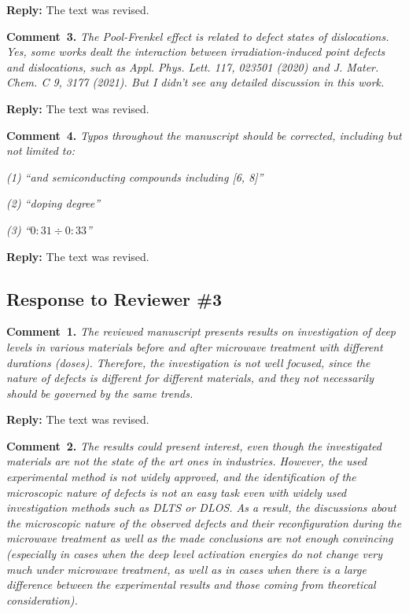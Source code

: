 \documentclass[10pt]{iopart}
\begin{document}
\noindent
\textcolor[rgb]{0.51,0.00,0.00}{\textbf{Reply:}}
The text was revised.


\vspace{1cm}
\noindent
\textcolor[rgb]{0.00,0.50,1.00}{\textbf{Comment~3.}}
\emph{The Pool-Frenkel effect is related to defect states of dislocations.
Yes, some works dealt the interaction between irradiation-induced point defects and dislocations,
such as Appl. Phys. Lett. 117, 023501 (2020) and J. Mater. Chem. C 9, 3177 (2021).
But I didn’t see any detailed discussion in this work.}

\noindent
\textcolor[rgb]{0.51,0.00,0.00}{\textbf{Reply:}}
The text was revised.

\cite{LightNeuIrrad:1,LightNeuIrrad:2,SiC:bookCh17}


\vspace{1cm}
\noindent
\textcolor[rgb]{0.00,0.50,1.00}{\textbf{Comment~4.}}
\emph{Typos throughout the manuscript should be corrected, including but not limited to:}

\emph{(1) ``and semiconducting compounds including [6, 8]''}

\emph{(2) ``doping degree''}

\emph{(3) ``$0:31\div0:33$''}

\noindent
\textcolor[rgb]{0.51,0.00,0.00}{\textbf{Reply:}}
The text was revised.


\subsection*{Response to Reviewer \#3 }
\noindent
\textcolor[rgb]{0.00,0.50,1.00}{\textbf{Comment~1.}}
\emph{The reviewed manuscript presents results on investigation of deep levels
in various materials before and after microwave treatment with different durations (doses).
Therefore, the investigation is not well focused, since the nature of defects is different
for different materials, and they not necessarily should be governed by the same trends. }

\noindent
\textcolor[rgb]{0.51,0.00,0.00}{\textbf{Reply:}}
The text was revised.


\vspace{1cm}
\noindent
\textcolor[rgb]{0.00,0.50,1.00}{\textbf{Comment~2.}}
\emph{The results could present interest, even though the investigated materials are not the state of the art ones in industries.
However, the used experimental method is not widely approved,
and the identification of the microscopic nature of defects is not an easy
task even with widely used investigation methods such as DLTS or DLOS.
As a result, the discussions about the microscopic nature of the observed defects
and their reconfiguration during the microwave treatment
as well as the made conclusions are not enough convincing
(especially in cases when the deep level activation
energies do not change very much under microwave treatment,
as well as in cases when there is a large difference
between the experimental results and those coming from theoretical consideration).}
\end{document}
